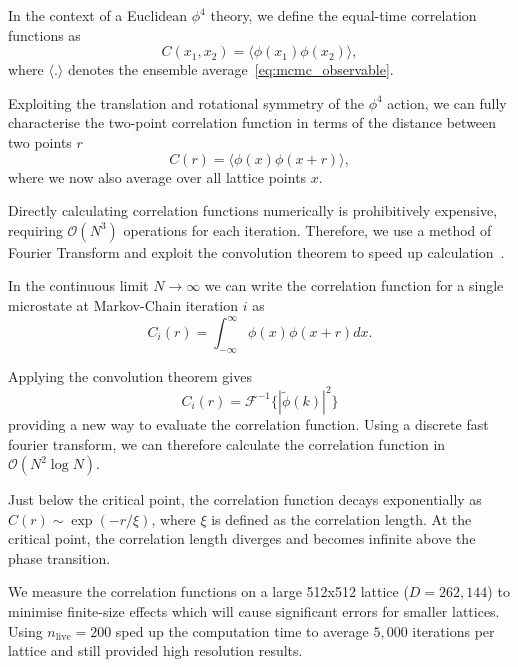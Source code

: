 \documentclass[11pt]{article}
\begin{document}
    In the context of a Euclidean $\phi^4$ theory, we define the equal-time correlation functions as
    \begin{equation}\label{eq:full_correlation_function}
    C(x_1, x_2) = \langle \phi(x_1) \phi(x_2) \rangle,
    \end{equation}
    where $\langle . \rangle$ denotes the ensemble average~\eqref{eq:mcmc_observable}.

    Exploiting the translation and rotational symmetry of the $\phi^4$ action, we can fully characterise the two-point
    correlation function in terms of the distance between two points $r$
    \begin{equation}\label{eq:correlation_function}
    C(r) = \langle \phi(x) \phi(x + r) \rangle,
    \end{equation}
    where we now also average over all lattice points $x$.

    Directly calculating correlation functions numerically is prohibitively expensive, requiring $\mathcal{O}(N^3)$
    operations for each iteration.
    Therefore, we use a method of Fourier Transform and exploit the convolution theorem to speed up
    calculation~\cite{Ruge_1994}.

    In the continuous limit $N \rightarrow \infty$ we can write the correlation function for a single microstate at
    Markov-Chain iteration $i$ as
    \begin{equation}\label{eq:continuous_correlation}
        C_{i}(r) = \int_{-\infty}^{\infty} \phi(x) \phi(x + r) dx.
    \end{equation}

    Applying the convolution theorem gives
    \begin{equation}\label{eq:convolution_theorem}
        C_{i}(r) = \mathcal{F}^{-1} \{ |\tilde{\phi}(k)|^2 \}
    \end{equation}
    providing a new way to evaluate the correlation function.
    Using a discrete fast fourier transform, we can therefore calculate the correlation function in
    $\mathcal{O}(N^2 \log N)$.

    Just below the critical point, the correlation function decays exponentially as $C(r) \sim \exp(-r / \xi)$,
    where $\xi$ is defined as the correlation length.
    At the critical point, the correlation length diverges and becomes infinite above the phase transition.

    We measure the correlation functions on a large 512x512 lattice ($D=262,144$) to minimise finite-size effects which
    will cause significant errors for smaller lattices.
    Using $n_{\text{live}}=200$ sped up the computation time to average $5,000$ iterations per lattice and still
    provided high resolution results.
\end{document}
